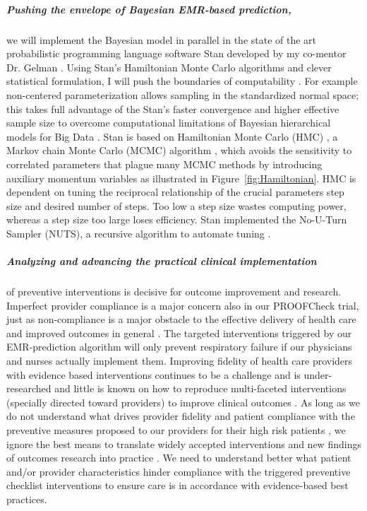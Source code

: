 \documentclass[11pt,notitlepage]{article}
\begin{document}
\subparagraph{Pushing the envelope of Bayesian EMR-based prediction,}
we will implement the Bayesian model in parallel in the state of the art probabilistic programming language software Stan developed by my co-mentor Dr. Gelman \cite{Stan_Software_2014}. Using Stan's Hamiltonian Monte Carlo algorithms \cite{Stan_Software_2014} and clever statistical formulation, I will push the boundaries of computability \cite{Gelman-Hill_2014}. For example non-centered parameterization allows sampling in the standardized normal space; this takes full advantage of the Stan's faster convergence and higher effective sample size to overcome computational limitations of Bayesian hierarchical models for Big Data \cite{Gelman-Hill_2014}. Stan  is based on Hamiltonian Monte Carlo (HMC) \cite{Gelman-Hill_2014}, a Markov chain Monte Carlo (MCMC) algorithm \cite{StanislawUlam_1949}, which avoids the sensitivity to correlated parameters that plague many MCMC methods by introducing auxiliary momentum variables \cite{Homan_Gelman_NUTS_2014} as illustrated in Figure~\ref{fig:Hamiltonian}. HMC is dependent on tuning the reciprocal relationship of the crucial parameters step size and desired number of steps. Too low a step size wastes computing power, whereas a step size too large loses efficiency. Stan implemented the No-U-Turn Sampler (NUTS), a recursive algorithm to automate tuning \cite{Homan_Gelman_NUTS_2014}.

\subparagraph*{Analyzing and advancing the practical clinical implementation} of preventive interventions is decisive for outcome improvement and research. Imperfect provider compliance is a major concern also in our PROOFCheck trial, just as non-compliance is a major obstacle to the effective delivery of health care and improved outcomes in general
\cite{Duncan_16710766}. The targeted interventions triggered by our EMR-prediction algorithm will only prevent respiratory failure if our physicians and nurses actually implement them. Improving fidelity of health care providers with evidence based interventions continues to be a challenge and is under-researched \cite{Davis_7650822} and little is known on how to reproduce multi-faceted interventions (specially directed toward providers) to improve clinical outcomes \cite{Campbell_10987780}. As long as we do not understand what drives provider fidelity and patient compliance with the preventive measures proposed to our providers for their high risk patients  \cite{Mittman_15172904}, we ignore the best means to translate widely accepted interventions and new findings of outcomes research into practice \cite{Glasgow_17150029}. We need to understand better what patient and/or provider characteristics hinder compliance with the triggered preventive checklist interventions to ensure care is in accordance with evidence-based best practices.
\end{document}
